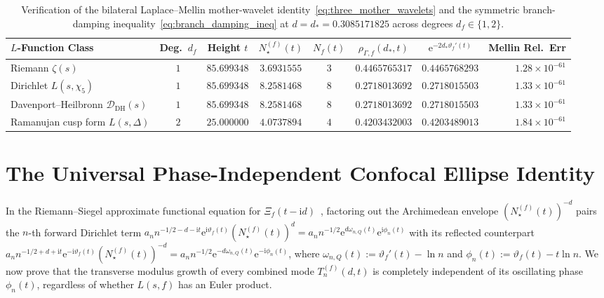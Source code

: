 \documentclass[11pt,reqno]{amsart}
\theoremstyle{definition}
\theoremstyle{remark}
\numberwithin{equation}{section}
\newcommand{\ee}{\mathrm{e}}
\newcommand{\ii}{\mathrm{i}}
\newcommand{\DHf}{\mathrm{DH}}
\begin{document}
\begin{table}[t]
\centering
\caption{Verification of the bilateral Laplace--Mellin mother-wavelet identity~\eqref{eq:three_mother_wavelets} and the symmetric branch-damping inequality~\eqref{eq:branch_damping_ineq} at $d = d_* = 0.3085171825$ across degrees $d_f \in \{1, 2\}$.}\label{tab:selberg_branch_damping}
\scriptsize
\begin{tabular}{@{}lccccccr@{}}
\toprule
$L$-Function Class & Deg.\ $d_f$ & Height $t$ & $N_\star^{(f)}(t)$ & $N_f(t)$ & $\rho_{\Gamma,f}(d_*,t)$ & $\ee^{-2d_*\vartheta_f'(t)}$ & Mellin Rel.\ Err \\
\midrule
Riemann $\zeta(s)$ & $1$ & $85.699348$ & $3.6931555$ & $3$ & $0.4465765317$ & $0.4465768293$ & $1.28 \times 10^{-61}$ \\
Dirichlet $L(s,\chi_5)$ & $1$ & $85.699348$ & $8.2581468$ & $8$ & $0.2718013692$ & $0.2718015503$ & $1.33 \times 10^{-61}$ \\
Davenport--Heilbronn $\mathcal{D}_{\DHf}(s)$ & $1$ & $85.699348$ & $8.2581468$ & $8$ & $0.2718013692$ & $0.2718015503$ & $1.33 \times 10^{-61}$ \\
Ramanujan cusp form $L(s,\Delta)$ & $2$ & $25.000000$ & $4.0737894$ & $4$ & $0.4203432003$ & $0.4203489013$ & $1.84 \times 10^{-61}$ \\
\bottomrule
\end{tabular}
\end{table}

\section{The Universal Phase-Independent Confocal Ellipse Identity}\label{sec:confocal_ellipse}

In the Riemann--Siegel approximate functional equation for $\Xi_f(t - \ii d)$~\cite{siegel1932,titchmarsh1986}, factoring out the Archimedean envelope $(N_\star^{(f)}(t))^{-d}$ pairs the $n$-th forward Dirichlet term $a_n n^{-1/2-d-\ii t}\ee^{\ii\vartheta_f(t)}(N_\star^{(f)}(t))^d = a_n n^{-1/2}\ee^{d\omega_{n,Q}(t)}\ee^{\ii\phi_n(t)}$ with its reflected counterpart $a_n n^{-1/2+d+\ii t}\ee^{-\ii\vartheta_f(t)}(N_\star^{(f)}(t))^{-d} = a_n n^{-1/2}\ee^{-d\omega_{n,Q}(t)}\ee^{-\ii\phi_n(t)}$, where $\omega_{n,Q}(t) := \vartheta_f'(t) - \ln n$ and $\phi_n(t) := \vartheta_f(t) - t\ln n$. We now prove that the transverse modulus growth of every combined mode $T_n^{(f)}(d,t)$ is completely independent of its oscillating phase $\phi_n(t)$, regardless of whether $L(s,f)$ has an Euler product.
\end{document}
